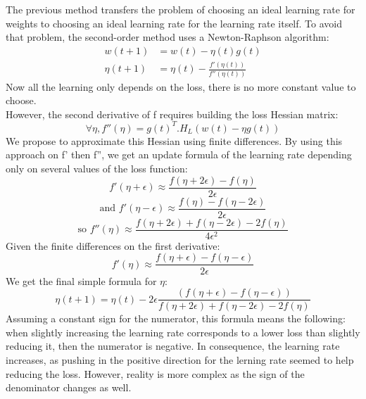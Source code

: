 \documentclass{article}
\begin{document}
  The previous method transfers the problem of choosing an ideal learning rate for weights to choosing an ideal learning rate for the learning rate itself. To avoid that problem, the second-order method uses a Newton-Raphson algorithm:\\
  \begin{align}  
  w(t+1) &= w(t) -\eta(t)g(t)\\
  \eta(t+1) &= \eta(t) - \frac{f'(\eta(t))}{f''(\eta(t))}
  \end{align}
  Now all the learning only depends on the loss, there is no more constant value to choose. \\
  However, the second derivative of f requires building the loss Hessian matrix:\\
  \begin{equation}
  \forall \eta, f''(\eta) = g(t)^{T}.H_{L}(w(t)-\eta g(t))
  \end{equation}
  We propose to approximate this Hessian using finite differences. By using this approach on f' then f'', we get an update formula of the learning rate depending only on several values of the loss function:\\
  \begin{equation}
  f'(\eta+\epsilon) \approx \frac{f(\eta + 2\epsilon)-f(\eta)}{2\epsilon}
  \end{equation}
  \begin{equation}
  \text{and }f'(\eta-\epsilon) \approx \frac{f(\eta)-f(\eta-2\epsilon)}{2\epsilon}
  \end{equation}  
  \begin{equation}
  \text{so }f''(\eta) \approx \frac{f(\eta+2\epsilon)+f(\eta-2\epsilon)-2f(\eta)}{4 \epsilon^{2}}
  \end{equation}
  Given the finite differences on the first derivative:\\    
  \begin{equation}
  f'(\eta) \approx \frac{f(\eta+\epsilon)-f(\eta-\epsilon)}{2 \epsilon}
  \end{equation}
  We get the final simple formula for $\eta$:\\
  \begin{equation}
  \eta(t+1) = \eta(t) - 2\epsilon\frac{(f(\eta+\epsilon)-f(\eta-\epsilon))}{f(\eta+2\epsilon)+f(\eta-2\epsilon)-2f(\eta)}
  \end{equation}    
  Assuming a constant sign for the numerator, this formula means the following: when slightly increasing the learning rate corresponds to a lower loss than slightly reducing it, then the numerator is negative. In consequence, the learning rate increases, as pushing in the positive direction for the lerning rate seemed to help reducing the loss. However, reality is more complex as the sign of the denominator changes as well. 
  
\end{document}
